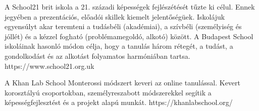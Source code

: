 A School21 brit iskola a 21. századi képességek fejlészétését tűzte ki
célul. Ennek jegyében a prezentációs, előadói skillek kiemelt
jelentőségüek. Iskolájuk egyensúlyt akar teremteni a tudásbéli
(akadémiai), a szívbéli (személyiség és jóllét) és a kézzel fogható
(problémamegoldó, alkotó) között. A Budapest School iskoláinak hasonló
módon célja, hogy a tanulás három rétegét, a tudást, a gondolkodást és
az alkotást folyamatos harmóniában tartsa. https://www.school21.org.uk

A Khan Lab School Monterossi módszert keveri az online tanulással. Kevert
korosztályú csoportokban, személyreszabott módszerekkel segítik a
képességfejlesztést és a projekt alapú munkát.
https://khanlabschool.org/

